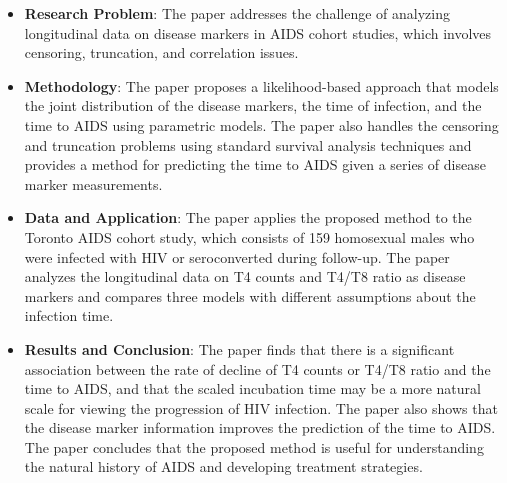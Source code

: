 \documentclass[UTF8,a4paper,10pt]{article}
\begin{document}
\begin{itemize}
  \item \textbf{Research Problem}: The paper addresses the challenge of analyzing longitudinal data on disease markers in AIDS cohort studies, which involves censoring, truncation, and correlation issues.
  \item \textbf{Methodology}: The paper proposes a likelihood-based approach that models the joint distribution of the disease markers, the time of infection, and the time to AIDS using parametric models. The paper also handles the censoring and truncation problems using standard survival analysis techniques and provides a method for predicting the time to AIDS given a series of disease marker measurements.
  \item \textbf{Data and Application}: The paper applies the proposed method to the Toronto AIDS cohort study, which consists of 159 homosexual males who were infected with HIV or seroconverted during follow-up. The paper analyzes the longitudinal data on T4 counts and T4/T8 ratio as disease markers and compares three models with different assumptions about the infection time.
  \item \textbf{Results and Conclusion}: The paper finds that there is a significant association between the rate of decline of T4 counts or T4/T8 ratio and the time to AIDS, and that the scaled incubation time may be a more natural scale for viewing the progression of HIV infection. The paper also shows that the disease marker information improves the prediction of the time to AIDS. The paper concludes that the proposed method is useful for understanding the natural history of AIDS and developing treatment strategies.
\end{itemize}


\begin{equation*}
  \begin{aligned}
  \end{aligned}
\end{equation*}
\end{document}
